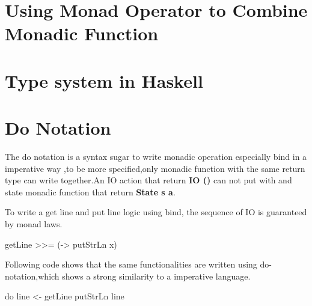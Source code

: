 \section{Using Monad Operator to Combine Monadic Function}

\section{Type system in Haskell}
\section{Do Notation }
The do notation is a syntax sugar to write monadic operation especially bind in a imperative way ,to be more specified,only monadic function with the same return type can write together.An IO action that return \textbf{IO ()} can not put with and state monadic function that return \textbf{State s a}.

To write a get line and put line logic using bind, the sequence of IO is guaranteed by monad laws.
\begin{hcode}
 getLine >>= (\x -> putStrLn x)
\end{hcode}


Following code shows that the same functionalities are written using do-notation,which shows a strong similarity to a imperative language.
\begin{hcode}
do line <- getLine 
   putStrLn line
\end{hcode}


